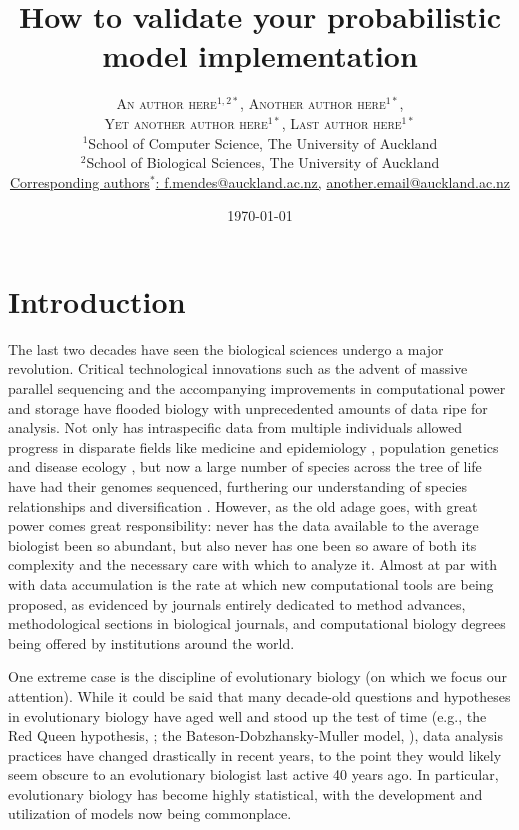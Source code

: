 \documentclass[oneside]{article}
\title{How to validate your probabilistic model implementation} %
\author{\textsc{An author here$^{1,2*}$}, \textsc{Another author
    here$^{1*}$}, \\ \textsc{Yet another author here$^{1*}$},
  \textsc{Last author here$^{1*}$} \\
\small $^1$School of Computer Science, The University of Auckland\\
\small $^2$School of Biological Sciences, The University of Auckland\\
\small
\href{mailto:f.mendes@auckland.ac.nz}{Corresponding authors$^*$: f.mendes@auckland.ac.nz,}
\href{mailto:f.mendes@auckland.ac.nz}{another.email@auckland.ac.nz}
}
\date{\today} %
\begin{document}
\maketitle


\section*{Introduction}
The last two decades have seen the biological sciences undergo a major revolution.
Critical technological innovations such as the advent of massive parallel sequencing and the accompanying improvements in computational power and storage have flooded biology with unprecedented amounts of data ripe for analysis.
Not only has intraspecific data from multiple individuals allowed
progress in disparate fields like medicine and epidemiology
\citep[e.g.,][]{1000g,humanmicrobiome,neafsey15}, population genetics \citep[e.g.,][]{lynch07,lack16,demanuel16} and disease ecology \citep[e.g.][]{rosenblum13,bates18}, but now a large number of species across the tree of life have had their genomes sequenced, furthering our understanding of species relationships and diversification \citep[e.g.,][]{martin13,brawand14,jarvis14,novikova16,pease2016,kawahara19,upham19}.
However, as the old adage goes, with great power comes great responsibility: never has the data available to the average biologist been so abundant, but also never has one been so aware of both its complexity and the necessary care with which to analyze it.
Almost at par with with data accumulation is the rate at which new computational tools are being proposed, as evidenced by journals entirely dedicated to method advances, methodological sections in biological journals, and computational biology degrees being offered by institutions around the world.

One extreme case is the discipline of evolutionary biology (on which we focus our attention).
While it could be said that many decade-old questions and hypotheses
in evolutionary biology have aged well and stood up the test of time
(e.g., the Red Queen hypothesis,
\citealt{vanvalen73,lively87,morran11,gibson15}; the
Bateson-Dobzhansky-Muller model, \citealt{dob36,muller40,hopkins12,roda17}), data analysis
practices have changed drastically in recent years, to the
point they would likely seem obscure to an evolutionary biologist last active 40 years ago.
In particular, evolutionary biology has become highly statistical, with the development and utilization of models now being commonplace.
\end{document}
